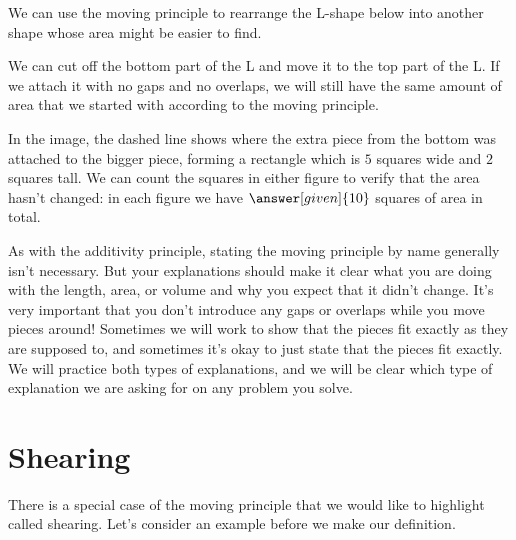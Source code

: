 \documentclass{ximera}
\begin{document}
\begin{example}
We can use the moving principle to rearrange the L-shape below into another shape whose area might be easier to find.
\begin{image}
\end{image}
We can cut off the bottom part of the L and move it to the top part of the L. If we attach it with no gaps and no overlaps, we will still have the same amount of area that we started with according to the moving principle.
\begin{image}
\end{image}
In the image, the dashed line shows where the extra piece from the bottom was attached to the bigger piece, forming a rectangle which is $5$ squares wide and $2$ squares tall. We can count the squares in either figure to verify that the area hasn't changed: in each figure we have $\answer[given]{10}$ squares of area in total.


\end{example}

As with the additivity principle, stating the moving principle by name generally isn't necessary. But your explanations should make it clear what you are doing with the length, area, or volume and why you expect that it didn't change. It's very important that you don't introduce any gaps or overlaps while you move pieces around! Sometimes we will work to show that the pieces fit exactly as they are supposed to, and sometimes it's okay to just state that the pieces fit exactly. We will practice both types of explanations, and we will be clear which type of explanation we are asking for on any problem you solve.




\section{Shearing}

There is a special case of the moving principle that we would like to highlight called shearing. Let's consider an example before we make our definition.
\end{document}
